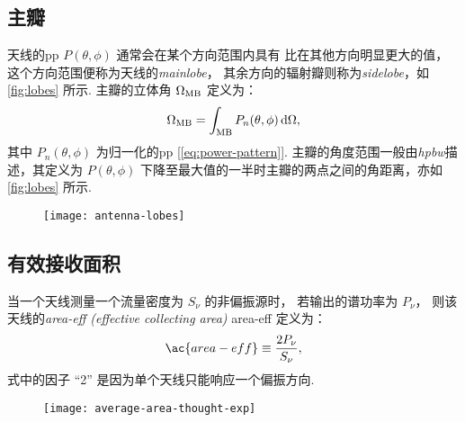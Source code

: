 \subsection{主瓣}

天线的\ac{pp} $P(\theta,\phi)$ 通常会在某个方向范围内具有
比在其他方向明显更大的值，
这个方向范围便称为天线的\emph{\acf{mainlobe}}，
其余方向的辐射瓣则称为\emph{\acf{sidelobe}}，如\autoref{fig:lobes} 所示.
主瓣的立体角 $\Omega_{\mathrm{MB}}$ 定义为：
\begin{equation}
  \label{eq:omega-mb}
  \Omega_{\mathrm{MB}} = \int_{\mathrm{MB}} P_n(\theta,\phi) \,\mathrm{d}\Omega ,
\end{equation}
其中 $P_n(\theta,\phi)$ 为归一化的\ac{pp} [\autoref{eq:power-pattern}].
主瓣的角度范围一般由\emph{\acf{hpbw}}描述，其定义为 $P(\theta,\phi)$
下降至最大值的一半时主瓣的两点之间的角距离，亦如\autoref{fig:lobes} 所示.

\begin{figure}[htp]
  \centering
  \texttt{[image: antenna-lobes]}
  \label{fig:lobes}
\end{figure}

\subsection{有效接收面积}

当一个天线测量一个流量密度为 $S_{\nu}$ 的非偏振源时，
若输出的谱功率为 $P_{\nu}$，
则该天线的\emph{\acl{area-eff} (effective collecting area)} \ac{area-eff}
定义为：
\begin{equation}
  \label{eq:area-eff}
  \ac{area-eff} \equiv \frac{2 P_{\nu}}{S_{\nu}} ,
\end{equation}
式中的因子 \enquote{2} 是因为单个天线只能响应一个偏振方向.

\begin{figure}[htp]
  \centering
  \texttt{[image: average-area-thought-exp]}
  \label{fig:area-avg-exp}
\end{figure}

